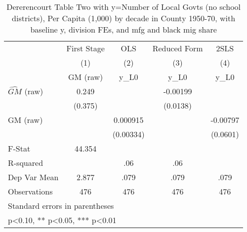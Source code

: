 \begin{table}[htbp]\centering
\def\sym#1{\ifmmode^{#1}\else\(^{#1}\)\fi}
\caption{Dererencourt Table Two with y=Number of Local Govts (no school districts), Per Capita (1,000) by decade in County 1950-70, with baseline y, division FEs, and mfg and black mig share}
\begin{tabular}{l*{4}{c}}
\toprule
                    & First Stage   &         OLS   &Reduced Form   &        2SLS   \\
                    &\multicolumn{1}{c}{(1)}&\multicolumn{1}{c}{(2)}&\multicolumn{1}{c}{(3)}&\multicolumn{1}{c}{(4)}\\
                    &\multicolumn{1}{c}{GM  (raw)}&\multicolumn{1}{c}{y\_L0}&\multicolumn{1}{c}{y\_L0}&\multicolumn{1}{c}{y\_L0}\\
\midrule
$\hat{GM}$ (raw)    &       0.249   &               &    -0.00199   &               \\
                    &     (0.375)   &               &    (0.0138)   &               \\
\addlinespace
GM  (raw)           &               &    0.000915   &               &    -0.00797   \\
                    &               &   (0.00334)   &               &    (0.0601)   \\
\midrule
F-Stat              &      44.354   &               &               &               \\
R-squared           &               &         .06   &         .06   &               \\
Dep Var Mean        &       2.877   &        .079   &        .079   &        .079   \\
Observations        &         476   &         476   &         476   &         476   \\
\bottomrule
\multicolumn{5}{l}{\footnotesize Standard errors in parentheses}\\
\multicolumn{5}{l}{\footnotesize * p<0.10, ** p<0.05, *** p<0.01}\\
\end{tabular}
\end{table}
